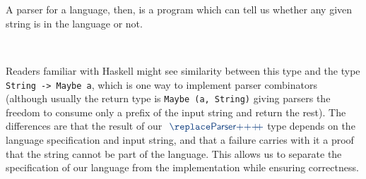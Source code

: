 \begin{code}%
%
\>[4]\AgdaSpace{}%
\AgdaSpace{}%
\AgdaSymbol{(}\AgdaSpace{}%
\AgdaSymbol{:}\AgdaSpace{}%
\AgdaSymbol{)}\AgdaSpace{}%
\AgdaSymbol{:}\AgdaSpace{}%
\AgdaSpace{}%
\<%
\\
\>[4][@{}l@{\AgdaIndent{0}}]%
\>[8]\AgdaSpace{}%
\AgdaSymbol{:}\AgdaSpace{}%
\AgdaSpace{}%
\AgdaSpace{}%
\AgdaSpace{}%
\<%
\\
%
\>[8]\AgdaSpace{}%
\AgdaSymbol{:}\AgdaSpace{}%
\AgdaSpace{}%
\AgdaSpace{}%
\AgdaSpace{}%
\AgdaSpace{}%
\<%
\end{code}

A parser for a language, then, is a program which can tell us whether any given string is in the language or not.

\begin{code}%
%
\>[4]\AgdaSpace{}%
\AgdaSymbol{:}\AgdaSpace{}%
\AgdaSpace{}%
\AgdaSpace{}%
\<%
\\
%
\>[4]\AgdaSpace{}%
\AgdaSpace{}%
\AgdaSymbol{=}\AgdaSpace{}%
\AgdaSymbol{(}\AgdaSpace{}%
\AgdaSymbol{:}\AgdaSpace{}%
\AgdaSymbol{)}\AgdaSpace{}%
\AgdaSpace{}%
\AgdaSpace{}%
\AgdaSymbol{(}\AgdaSpace{}%
\AgdaSymbol{)}\<%
\end{code}

\begin{remark}
Readers familiar with Haskell might see similarity between this type and the type \verb|String -> Maybe a|, which is one way to implement parser combinators (although usually the return type is \verb|Maybe (a, String)| giving parsers the freedom to consume only a prefix of the input string and return the rest). The differences are that the result of our $\af{Parser}$ type depends on the language specification and input string, and that a failure carries with it a proof that the string cannot be part of the language. This allows us to separate the specification of our language from the implementation while ensuring correctness.
\end{remark}

